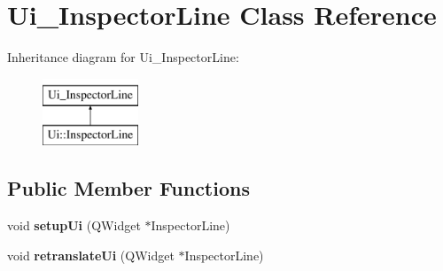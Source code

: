 \hypertarget{class_ui___inspector_line}{}\section{Ui\+\_\+\+Inspector\+Line Class Reference}
\label{class_ui___inspector_line}
Inheritance diagram for Ui\+\_\+\+Inspector\+Line\+:\begin{figure}[H]
\begin{center}
\leavevmode
\includegraphics[height=2.000000cm]{class_ui___inspector_line}
\end{center}
\end{figure}
\subsection*{Public Member Functions}
\begin{DoxyCompactItemize}
\item 
\mbox{\label{class_ui___inspector_line_ad2df215839546e8ffd0ece0cd64f3f57}} 
void {\bfseries setup\+Ui} (Q\+Widget $\ast$Inspector\+Line)
\item 
\mbox{\label{class_ui___inspector_line_a28d2c10b22814e8fa5a2459a1ff1b670}} 
void {\bfseries retranslate\+Ui} (Q\+Widget $\ast$Inspector\+Line)
\end{DoxyCompactItemize}
